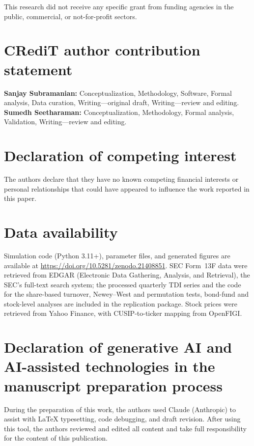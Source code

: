 \documentclass[preprint,12pt,authoryear]{elsarticle}
\begin{document}
This research did not receive any specific grant from funding agencies
in the public, commercial, or not-for-profit sectors.

\section*{CRediT author contribution statement}

\textbf{Sanjay Subramanian:} Conceptualization, Methodology, Software,
Formal analysis, Data curation, Writing---original draft,
Writing---review and editing.
\textbf{Sumedh Seetharaman:} Conceptualization, Methodology,
Formal analysis, Validation, Writing---review and editing.

\section*{Declaration of competing interest}

The authors declare that they have no known competing financial interests
or personal relationships that could have appeared to influence the work
reported in this paper.

\section*{Data availability}

Simulation code (Python 3.11+), parameter files, and generated figures
are available at \url{https://doi.org/10.5281/zenodo.21408851}.
SEC Form~13F data were retrieved from EDGAR (Electronic Data Gathering, Analysis, and Retrieval), the SEC's full-text search system;
the processed quarterly TDI series and the code for the share-based turnover,
Newey--West and permutation tests, bond-fund and stock-level analyses are
included in the replication package.
Stock prices were retrieved from Yahoo Finance, with CUSIP-to-ticker mapping
from OpenFIGI.

\section*{Declaration of generative AI and AI-assisted technologies
          in the manuscript preparation process}

During the preparation of this work, the authors used Claude (Anthropic)
to assist with LaTeX typesetting, code debugging, and draft revision.
After using this tool, the authors reviewed and edited all content and
take full responsibility for the content of this publication.
\end{document}
